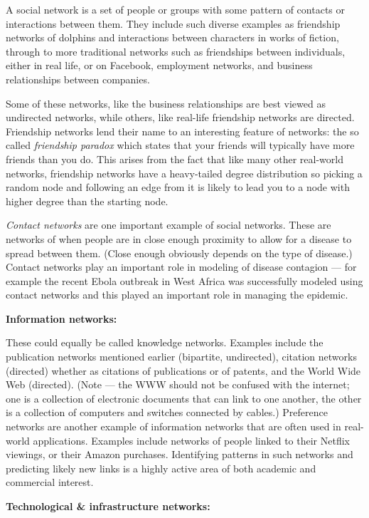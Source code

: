\documentclass{article}
\begin{document}
A social network is a set of people or groups with some pattern of contacts or interactions between them. They include such diverse examples as friendship networks of dolphins and interactions between characters in works of fiction, through to more traditional networks such as friendships between individuals, either in real life, or on Facebook, employment networks, and business relationships between companies.

Some of these networks, like the business relationships are best viewed as undirected networks, while others, like real-life friendship networks are directed. Friendship networks lend their name to an interesting feature of networks: the so called \emph{friendship paradox} which states that your friends will typically have more friends than you do. This arises from the fact that like many other real-world networks, friendship networks have a heavy-tailed degree distribution so picking a random node and following an edge from it is likely to lead you to a node with higher degree than the starting node.

\emph{Contact networks} are one important example of social networks. These are networks of when people are in close enough proximity to allow for a disease to spread between them. (Close enough obviously depends on the type of disease.) Contact networks play an important role in modeling of disease contagion --- for example the recent Ebola outbreak in West Africa was successfully modeled using contact networks and this played an important role in managing the epidemic.



{\bf Information networks:}

These could equally be called knowledge networks. Examples include the publication networks mentioned earlier (bipartite, undirected), citation networks (directed) whether as citations of publications or of patents, and the World Wide Web (directed). (Note --- the WWW should not be confused with the internet; one is a collection of electronic documents that can link to one another, the other is a collection of computers and switches connected by cables.) Preference networks are another example of information networks that are often used in real-world applications. Examples include networks of people linked to their Netflix viewings, or their Amazon purchases. Identifying patterns in such networks and predicting likely new links is a highly active area of both academic and commercial interest.


{\bf Technological \& infrastructure networks:} 
\end{document}
